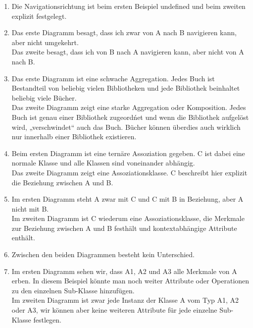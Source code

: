 \documentclass[a4paper, 12pt, margins=2cm]{homework}
\begin{document}
  \begin{problem}
    
  \end{problem}
  \begin{solution}\hfill

    \begin{enumerate}[label=\alph*)]\itemsep0pt
      \item Die Navigationsrichtung ist beim ersten Beispiel undefined und beim 
            zweiten explizit festgelegt.
      \item Das erste Diagramm besagt, dass ich zwar von A nach B navigieren kann,
            aber nicht umgekehrt.\\
            Das zweite besagt, dass ich von B nach A navigieren kann, aber nicht
            von A nach B.
      \item Das erste Diagramm ist eine schwache Aggregation. Jedes Buch ist Bestandteil
            von beliebig vielen Bibliotheken und jede Bibliothek beinhaltet beliebig
            viele Bücher.\\
            Das zweite Diagramm zeigt eine starke Aggregation oder Komposition. 
            Jedes Buch ist genau einer Bibliothek zugeordńet und wenn die Bibliothek
            aufgelöst wird, „verschwindet“ auch das Buch. Bücher können überdies
            auch wirklich nur innerhalb einer Bibliothek existieren.
      \item Beim ersten Diagramm ist eine ternäre Assoziation gegeben. C ist dabei
            eine normale Klasse und alle Klassen sind voneinander abhängig.\\
            Das zweite Diagramm zeigt eine Assoziationsklasse. C beschreibt hier
            explizit die Beziehung zwischen A und B.
      \item Im ersten Diagramm steht A zwar mit C und C mit B in Beziehung, aber
            A nicht mit B. \\
            Im zweiten Diagramm ist C wiederum eine Assoziationsklasse, die Merkmale
            zur Beziehung zwischen A und B festhält und kontextabhängige Attribute enthält.
      \item Zwischen den beiden Diagrammen besteht kein Unterschied.
      \item Im ersten Diagramm sehen wir, dass A1, A2 und A3 alle Merkmale von A
            erben. In diesem Beispiel könnte man noch weiter Attribute oder Operationen
            zu den einzelnen Sub-Klasse hinzufügen. \\
            Im zweiten Diagramm ist zwar jede Instanz der Klasse A vom Typ A1, A2
            oder A3, wir können aber keine weiteren Attribute für jede einzelne
            Sub-Klasse festlegen.
    \end{enumerate}
    
  \end{solution}
\end{document}

